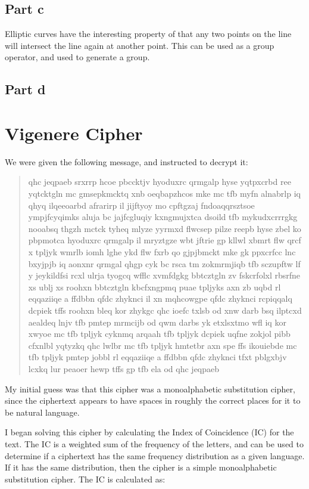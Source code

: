 \documentclass[11pt,a4paper,twoside]{article}
\begin{document}
\subsection{Part c}
Elliptic curves have the interesting property of that any two points on the
line will intersect the line again at another point. This can be used as a
group operator, and used to generate a group. 

\subsection{Part d}


\vfill
\pagebreak
\section{Vigenere Cipher}
We were given the following message, and instructed to decrypt it:

\begin{quote}
\small
\raggedright
qhc jeqpaeb srxrrp hcoe pbccktjv hyoduxrc qrmgalp hyse yqtpxcrbd ree yqtcktgln
mc gmsepkmcktq xnb oeqbapzhcos mke mc tfb myfn alnabrlp iq qhyq ilqeeoarbd
afrarirp il jijftyoy mo cpftgzaj fndoaqqrsztsoe ympjfcyqimks aluja bc
jajfcgluqiy kxngmujxtca dsoild tfb mykudxcrrrgkg nooabsq thgzh mctck tyheq
mlyze yyrmxd flwcsep pilze reepb hyse zbel ko pbpmotca hyoduxrc qrmgalp il
mryztgze wbt jftrie gp kllwl xbmrt flw qrcf x tpljyk wmrlb iomh lghe ykd flw
fxrb qo gjpjbmckt mke gk ppxcrfcc lnc bxyjpjb iq aonxnr qrmgal qhgp cyk bc rsca
tm zokmrmjiqb tfb sczupftw lf y jeykildfsi rcxl ulrja tyogcq wfflc xvmfdgkg
bbtcztgln zv fskcrfolxl rbsrfne xs ublj xs roohxn bbtcztgln kbcfxngpmq puae
tpljyks axn zb uqbd rl eqqaziiqe a ffdbbn qfdc zhyknci il xn mqhcowgpe qfdc
zhyknci rcpiqqalq dcpiek tffs roohxn bleq kor zhykgc qhc ioefc txlsb od xnw
darb bsq ilptcxd aealdeq lnjv tfb pmtep mrmcijb od qwm darbs yk etxlsxtmo wfl
iq kor xwyoe mc tfb tpljyk cyknmq arqaah tfb tpljyk dcpiek uqfne zokjol pibb
cfxnlbl yqtyzkq qhc lwlbr mc tfb tpljyk hmtetbr axn spe ffs ikouiebde mc tfb
tpljyk pmtep jobbl rl eqqaziiqe a ffdbbn qfdc zhyknci tfxt pblgxbjv lcxkq lur
peaoer hewp tffs gp tfb ela od qhc jeqpaeb 
\end{quote}

My initial guess was that this cipher was a monoalphabetic substitution cipher,
since the ciphertext appears to have spaces in roughly the correct places for
it to be natural language. 

I began solving this cipher by calculating the Index of Coincidence (IC) for
the text. The IC is a weighted sum of the frequency of the letters, and can be
used to determine if a ciphertext has the same frequency distribution as a given
language. If it has the same distribution, then the cipher is a simple
monoalphabetic substitution cipher. The IC is calculated as:
\end{document}

